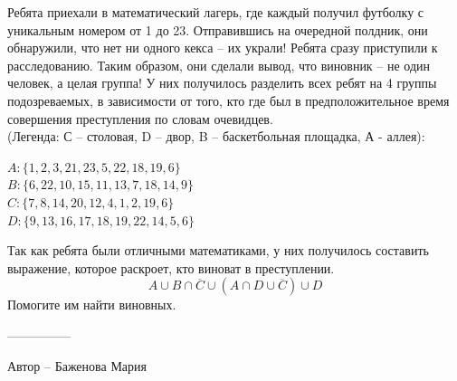 \question
Ребята приехали в математический лагерь, где каждый получил футболку с уникальным номером от 1 до 23. Отправившись на очередной полдник, они обнаружили, что нет ни одного кекса – их украли! Ребята сразу приступили к расследованию. Таким образом, они сделали вывод, что виновник – не один человек, а целая группа! У них получилось разделить всех ребят на 4 группы подозреваемых, в зависимости от того, кто где был в предположительное время совершения преступления по словам очевидцев.
\\(Легенда: С – столовая, D – двор, B – баскетбольная площадка, А - аллея): 
\begin{center}
$A: \{1, 2, 3, 21, 23, 5, 22, 18, 19, 6\}$
\\
$B: \{6, 22, 10, 15, 11, 13, 7, 18, 14, 9\}$
\\
$C: \{7, 8, 14, 20, 12, 4, 1, 2, 19, 6\}$
\\
$D: \{9, 13, 16, 17, 18, 19, 22, 14, 5, 6\}$
\end{center}
Так как ребята были отличными математиками, у них получилось составить выражение, которое раскроет, кто виноват в преступлении. 
\begin{equation*}
    A \cup B \cap \overline{C} \cup (A \cap D \cup \overline{C}) \cup D
\end{equation*}
Помогите им найти виновных.

---------------

Автор -- Баженова Мария